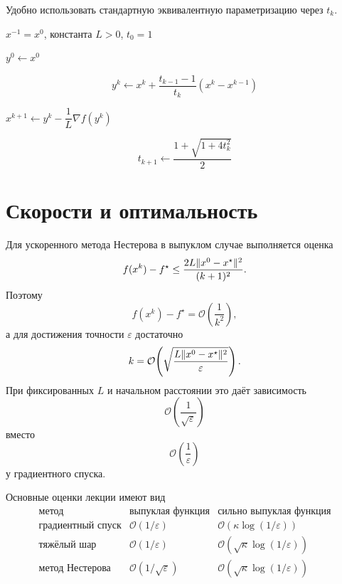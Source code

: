 Удобно использовать стандартную эквивалентную параметризацию через \(t_k\).

\begin{algorithm}[H]
\caption{Ускоренный градиентный метод для выпуклой функции}
\label{alg:nesterov-convex}
\begin{algorithmic}[1]

\Require
\(x^{-1}=x^0\), константа \(L>0\), \(t_0=1\)



        \State
        \(y^0\gets x^0\)

    \Else

        \State
        \[
            y^k
            \gets
            x^k
            +
            \frac{t_{k-1}-1}{t_k}
            (x^k-x^{k-1})
        \]

    \EndIf

    \State
    \(x^{k+1}
        \gets
        y^k-\dfrac1L\nabla f(y^k)\)

    \State
    \[
        t_{k+1}
        \gets
        \frac{1+\sqrt{1+4t_k^2}}2
    \]

\EndFor

\end{algorithmic}
\end{algorithm}

\section{Скорости и оптимальность}

Для ускоренного метода Нестерова в выпуклом случае выполняется оценка
\[
    f(x^k)-f^\star
    \le
    \frac{
        2L\lVert x^0-x^\star\rVert^2
    }{
        (k+1)^2
    }.
\]
Поэтому
\[
    f(x^k)-f^\star
    =
    \mathcal O\!\left(\frac1{k^2}\right),
\]
а для достижения точности \(\varepsilon\) достаточно
\[
    k
    =
    \mathcal O\!\left(
        \sqrt{
            \frac{
                L\lVert x^0-x^\star\rVert^2
            }{
                \varepsilon
            }
        }
    \right).
\]
При фиксированных \(L\) и начальном расстоянии это даёт зависимость
\[
    \mathcal O\!\left(
        \frac1{\sqrt\varepsilon}
    \right)
\]
вместо
\[
    \mathcal O\!\left(
        \frac1\varepsilon
    \right)
\]
у градиентного спуска.

Основные оценки лекции имеют вид
\[
\begin{array}{c|c|c}
    \text{метод}
    &
    \text{выпуклая функция}
    &
    \text{сильно выпуклая функция}
    \\
    \hline
    \text{градиентный спуск}
    &
    \mathcal O(1/\varepsilon)
    &
    \mathcal O\!\left(
        \kappa\log(1/\varepsilon)
    \right)
    \\
    \text{тяжёлый шар}
    &
    \mathcal O(1/\varepsilon)
    &
    \mathcal O\!\left(
        \sqrt\kappa\log(1/\varepsilon)
    \right)
    \\
    \text{метод Нестерова}
    &
    \mathcal O(1/\sqrt\varepsilon)
    &
    \mathcal O\!\left(
        \sqrt\kappa\log(1/\varepsilon)
    \right)
\end{array}
\]

